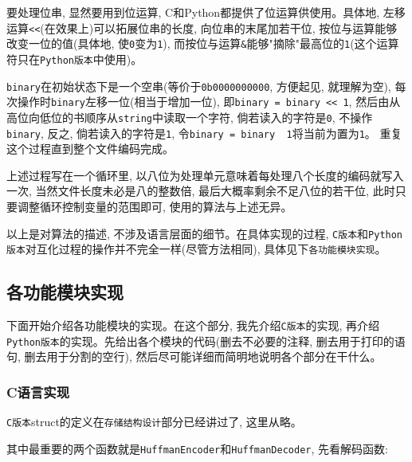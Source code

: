 \documentclass{ctexart}
\begin{document}
要处理位串, 显然要用到位运算, C和Python都提供了位运算供使用。具体地, 左移运算\texttt{\textless{}\textless{}}(在效果上)可以拓展位串的长度, 向位串的末尾加若干位, 按位与运算\texttt{\textbar{}}能够改变一位的值(具体地, 使\texttt{0}变为\texttt{1}), 而按位与运算\texttt{\&}能够"摘除"最高位的\texttt{1}(这个运算符只在\texttt{Python版本}中使用)。

\texttt{binary}在初始状态下是一个空串(等价于\texttt{0b0000000000}, 方便起见, 就理解为空), 每次操作时\texttt{binary}左移一位(相当于增加一位), 即\texttt{binary\ =\ binary\ \textless{}\textless{}\ 1}, 然后由从高位向低位的书顺序从\texttt{string}中读取一个字符, 倘若读入的字符是\texttt{0}, 不操作\texttt{binary}, 反之, 倘若读入的字符是\texttt{1}, 令\texttt{binary\ =\ binary\ \textbar{}\ 1}将当前为置为\texttt{1}。 重复这个过程直到整个文件编码完成。

上述过程写在一个循环里, 以八位为处理单元意味着每处理八个长度的编码就写入一次, 当然文件长度未必是八的整数倍, 最后大概率剩余不足八位的若干位, 此时只要调整循环控制变量的范围即可, 使用的算法与上述无异。

以上是对算法的描述, 不涉及语言层面的细节。在具体实现的过程, \texttt{C版本}和\texttt{Python版本}对互化过程的操作并不完全一样(尽管方法相同), 具体见下\texttt{各功能模块实现}。

\subsection{各功能模块实现}\label{header-n221}

下面开始介绍各功能模块的实现。在这个部分, 我先介绍\texttt{C版本}的实现, 再介绍\texttt{Python版本}的实现。先给出各个模块的代码(删去不必要的注释, 删去用于打印的语句, 删去用于分割的空行), 然后尽可能详细而简明地说明各个部分在干什么。

\subsubsection{C语言实现}\label{header-n223}

\texttt{C版本}struct的定义在\texttt{存储结构设计}部分已经讲过了, 这里从略。

其中最重要的两个函数就是\texttt{HuffmanEncoder}和\texttt{HuffmanDecoder}, 先看解码函数:
\end{document}
